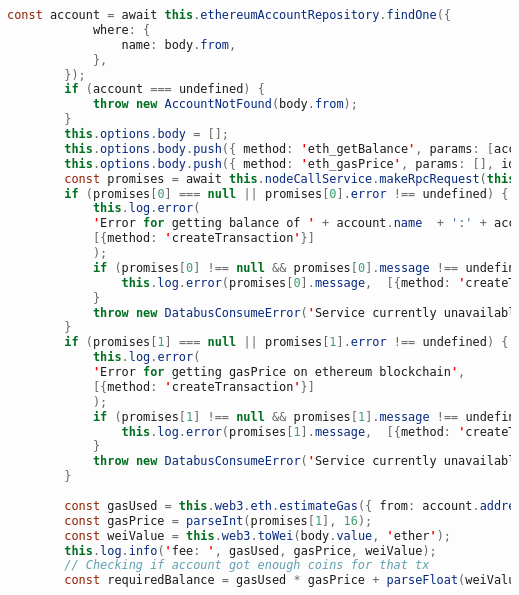 \begin{lstlisting}[language=java]
		const account = await this.ethereumAccountRepository.findOne({
			where: {
				name: body.from,
			},
		});
		if (account === undefined) {
			throw new AccountNotFound(body.from);
		}
		this.options.body = [];
		this.options.body.push({ method: 'eth_getBalance', params: [account.address, 'latest'], id: '777' });
		this.options.body.push({ method: 'eth_gasPrice', params: [], id: '777' });
		const promises = await this.nodeCallService.makeRpcRequest(this.options);
		if (promises[0] === null || promises[0].error !== undefined) {
			this.log.error(
			'Error for getting balance of ' + account.name  + ':' + account.address + ' on ethereum blockchain',
			[{method: 'createTransaction'}]
			);
			if (promises[0] !== null && promises[0].message !== undefined) {
				this.log.error(promises[0].message,  [{method: 'createTransaction'}]);
			}
			throw new DatabusConsumeError('Service currently unavailable');
		}
		if (promises[1] === null || promises[1].error !== undefined) {
			this.log.error(
			'Error for getting gasPrice on ethereum blockchain',
			[{method: 'createTransaction'}]
			);
			if (promises[1] !== null && promises[1].message !== undefined) {
				this.log.error(promises[1].message,  [{method: 'createTransaction'}]);
			}
			throw new DatabusConsumeError('Service currently unavailable');
		}
		
		const gasUsed = this.web3.eth.estimateGas({ from: account.address, to: body.to, value: this.web3.toWei(body.value, 'ether') });
		const gasPrice = parseInt(promises[1], 16);
		const weiValue = this.web3.toWei(body.value, 'ether');
		this.log.info('fee: ', gasUsed, gasPrice, weiValue);
		// Checking if account got enough coins for that tx
		const requiredBalance = gasUsed * gasPrice + parseFloat(weiValue);
		

\end{lstlisting}
